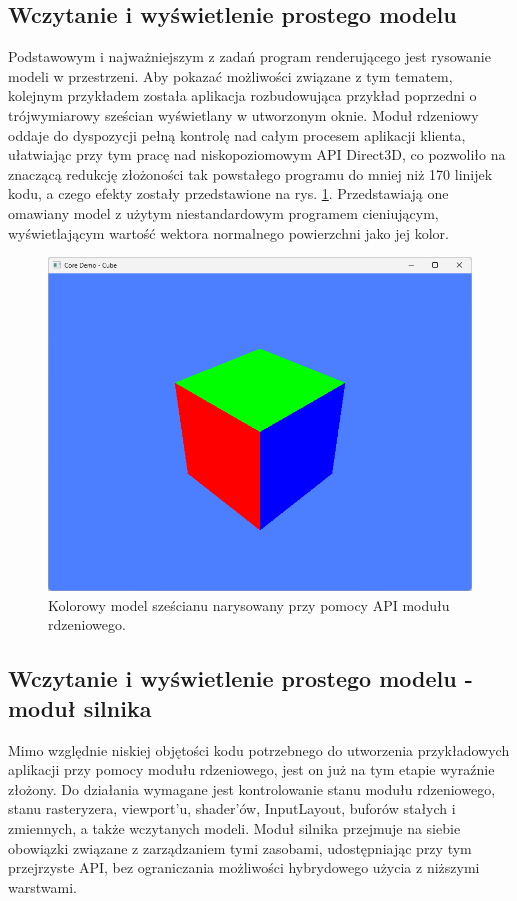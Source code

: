\subsection{Wczytanie i wyświetlenie prostego modelu}
Podstawowym i najważniejszym z zadań program renderującego jest rysowanie modeli w przestrzeni. Aby pokazać możliwości związane z tym tematem, kolejnym przykładem została aplikacja rozbudowująca przykład poprzedni o trójwymiarowy sześcian wyświetlany w utworzonym oknie. Moduł rdzeniowy oddaje do dyspozycji pełną kontrolę nad całym procesem aplikacji klienta, ułatwiając przy tym pracę nad niskopoziomowym API Direct3D, co pozwoliło na znaczącą redukcję złożoności tak powstałego programu do mniej niż 170 linijek kodu, a czego efekty zostały przedstawione na rys. \ref{demo_core_cube}. Przedstawiają one omawiany model z użytym niestandardowym programem cieniującym, wyświetlającym wartość wektora normalnego powierzchni jako jej kolor. 

\begin{figure}[h!]
	\centering
	\includegraphics[width=\textwidth]{images/demo_core_cube.png}
	\caption{Kolorowy model sześcianu narysowany przy pomocy API modułu rdzeniowego.}
	\label{demo_core_cube}
\end{figure}

\subsection{Wczytanie i wyświetlenie prostego modelu - moduł silnika}
\label{subsection_demo_engine_cube}
Mimo względnie niskiej objętości kodu potrzebnego do utworzenia przykładowych aplikacji przy pomocy modułu rdzeniowego, jest on już na tym etapie wyraźnie złożony. Do działania wymagane jest kontrolowanie stanu modułu rdzeniowego, stanu rasteryzera, viewport'u, shader'ów, InputLayout, buforów stałych i zmiennych, a także wczytanych modeli. Moduł silnika przejmuje na siebie obowiązki związane z zarządzaniem tymi zasobami, udostępniając przy tym przejrzyste API, bez ograniczania możliwości hybrydowego użycia z niższymi warstwami. 

